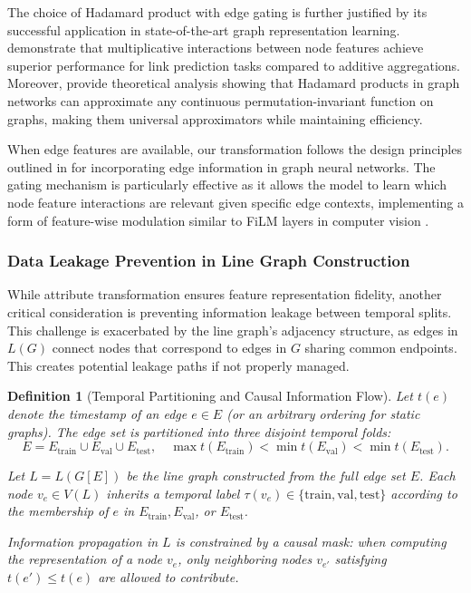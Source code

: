 \documentclass[pdflatex,sn-mathphys-num]{sn-jnl}%
\theoremstyle{thmstyleone}%
\theoremstyle{thmstyletwo}%
\theoremstyle{thmstylethree}%
\newtheorem{definition}{Definition}%
\theoremstyle{plain} %
\theoremstyle{definition} %
\theoremstyle{remark} %
\theoremstyle{plain} %
\begin{document}
The choice of Hadamard product with edge gating is further justified by its successful application in state-of-the-art graph representation learning. \cite{zhang2021nbfnet} demonstrate that multiplicative interactions between node features achieve superior performance for link prediction tasks compared to additive aggregations. Moreover, \cite{dimchev2023hadamard} provide theoretical analysis showing that Hadamard products in graph networks can approximate any continuous permutation-invariant function on graphs, making them universal approximators while maintaining efficiency.

When edge features are available, our transformation follows the design principles outlined in \cite{you2020design} for incorporating edge information in graph neural networks. The gating mechanism is particularly effective as it allows the model to learn which node feature interactions are relevant given specific edge contexts, implementing a form of feature-wise modulation similar to FiLM layers in computer vision \cite{perez2018film}.
    
\subsubsection{Data Leakage Prevention in Line Graph Construction}
\label{subsec:leakage_prevention}

While attribute transformation ensures feature representation fidelity, another critical consideration is preventing information leakage between temporal splits. 
This challenge is exacerbated by the line graph's adjacency structure, as edges in $L(G)$ connect nodes that correspond to edges in $G$ sharing common endpoints. This creates potential leakage paths if not properly managed.

\begin{definition}[Temporal Partitioning and Causal Information Flow]
\label{def:temporal_partitioning}
Let $t(e)$ denote the timestamp of an edge $e \in E$ (or an arbitrary ordering for
static graphs). The edge set is partitioned into three disjoint temporal folds:
\begin{equation}
E = E_{\text{train}} \cup E_{\text{val}} \cup E_{\text{test}},
\quad
\max t(E_{\text{train}}) < \min t(E_{\text{val}}) < \min t(E_{\text{test}}).
\end{equation}

Let $L = L(G[E])$ be the line graph constructed from the full edge set $E$.
Each node $v_e \in V(L)$ inherits a temporal label
$\tau(v_e) \in \{\text{train}, \text{val}, \text{test}\}$
according to the membership of $e$ in $E_{\text{train}}, E_{\text{val}}$, or
$E_{\text{test}}$.

Information propagation in $L$ is constrained by a causal mask: when computing
the representation of a node $v_e$, only neighboring nodes $v_{e'}$ satisfying
$t(e') \le t(e)$ are allowed to contribute.
\end{definition}
\end{document}

